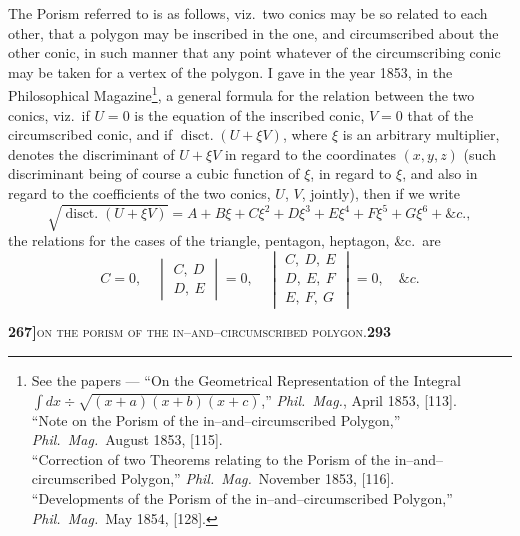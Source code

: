 \documentclass[11pt]{article}
\begin{document}
\noindent The Porism referred to is as follows, viz.\ two conics may be so related to each other, that a polygon may be inscribed in the one, and circumscribed about the other conic, in such manner that any point whatever of the circumscribing conic may be taken for a vertex of the polygon. I gave in the year 1853, in the Philosophical Magazine\footnote{See the papers --- ``On the Geometrical Representation of the Integral $\int dx \div \sqrt{(x + a)(x + b)(x + c)}$,'' \textit{Phil.\ Mag.}, April 1853, [113].\\
``Note on the Porism of the in--and--circumscribed Polygon,'' \textit{Phil.\ Mag.}\ August 1853, [115].\\
``Correction of two Theorems relating to the Porism of the in--and--circumscribed Polygon,'' \textit{Phil.\ Mag.}\ November 1853, [116].\\
``Developments of the Porism of the in--and--circumscribed Polygon,'' \textit{Phil.\ Mag.}\ May 1854, [128].}, a general formula for the relation between the two conics, viz.\ if $U = 0$ is the equation of the inscribed conic, $V = 0$ that of the circumscribed conic, and if $\operatorname{disct.}(U + \xi V)$, where $\xi$ is an arbitrary multiplier, denotes the discriminant of $U + \xi V$ in regard to the coordinates $(x, y, z)$ (such discriminant being of course a cubic function of $\xi$, in regard to $\xi$, and also in regard to the coefficients of the two conics, $U$, $V$, jointly), then if we write
\[
   \sqrt{\operatorname{disct.}(U + \xi V)} = A + B\xi + C\xi^2 + D\xi^3 + E\xi^4 + F\xi^5 + G\xi^6 + \&c.,
\]
the relations for the cases of the triangle, pentagon, heptagon, \&c.\ are
\[
   C = 0,\quad
   \begin{vmatrix} C,\ D\\ D,\ E\end{vmatrix} = 0,\quad
   \begin{vmatrix} C,\ D,\ E\\ D,\ E,\ F\\ E,\ F,\ G\end{vmatrix} = 0,\quad \&c.
\]

\newpage
\setcounter{page}{293}

\noindent\textbf{267]}\hfill\textsc{on the porism of the in--and--circumscribed polygon.}\hfill\textbf{293}

\medskip
\end{document}
